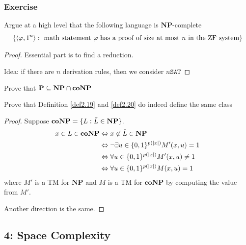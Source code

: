 \documentclass[11pt]{article}
\def \NP {\textbf{NP}}
\def \coNP {\textbf{coNP}}
\def \NP {\textbf{NP}}
\def \SAT {\texttt{SAT}}
\begin{document}
\subsubsection{Exercise}
\label{sec:org661c99d}
\begin{exercise}
\label{ex2.11}
Argue at a high level that the following language is \(\NP\)-complete
     \begin{equation*}
\left\{\langle\varphi,1^n\rangle:\text{ math statement }\varphi
\text{ has a proof of size at most $n$ in the ZF system}
\right\}
     \end{equation*}
\end{exercise}

\begin{proof}
Essential part is to find a reduction.

Idea: if there are \(n\) derivation rules, then we consider \(n\SAT\)
\end{proof}

\begin{exercise}
\label{ex2.23}
Prove that \(\bP\subseteq\NP\cap\coNP\)
\end{exercise}

\begin{exercise}
\label{ex2.24}
Prove that Definition \ref{def2.19} and \ref{def2.20} do indeed define the same class
\end{exercise}

\begin{proof}
Suppose \(\coNP=\{L:\barL\in\NP\}\).
     \begin{align*}
x\in L\in\coNP& \Leftrightarrow x\not\in\barL\in\NP\\
& \Leftrightarrow\neg\exists u\in\{0,1\}^{p(\abs{x})} M'(x,u)=1\\
&\Leftrightarrow\forall u\in\{0,1\}^{p(\abs{x})}M'(x,u)\neq1\\
&\Leftrightarrow\forall u\in\{0,1\}^{p(\abs{x})}M(x,u)=1\\
     \end{align*}
where \(M'\) is a TM for \(\NP\) and \(M\) is a TM for \(\coNP\) by computing the value
from \(M'\).

Another direction is the same.
\end{proof}

\subsection{4: Space Complexity}
\label{sec:org8723600}
\end{document}
